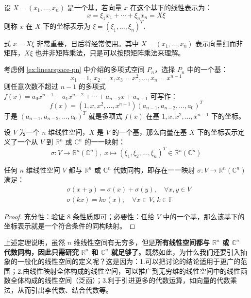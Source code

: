 \begin{definition}[坐标表示]
设 $X=(x_1,\ldots,x_n)$ 是一个基，若向量 $x$ 在这个基下的线性表示为：
\[x=\xi_1 x_1+\cdots+\xi_nx_n=X\xi\]
则称 $x$ 在 $X$ 下的坐标表示为 $\xi=(\xi_1,\ldots,\xi_n)^{T}$.
\end{definition}

\begin{remark}
式 $x=X\xi$ 非常重要，日后将经常使用。其中 $X=(x_1,\ldots,x_n)$ 表示向量组而非矩阵，$X\xi$ 也并非矩阵乘法，只是可以按照矩阵乘法来理解。
\end{remark}

\begin{example}
考虑例 \ref{ex:linearspace-pn} 中介绍的多项式空间 $P_n$，选择 $P_n$ 中的一个基：
\[
    x_1=1,\,x_2=x,x_3=x^2,\ldots,x_n=x^{n-1}
\]
则任意次数不超过 $n-1$ 的多项式 $f(x)=a_0x^{n-1}+a_1x^{n-2}+\cdots+a_{n-2}x+a_{n-1}$ 可写作：
\[
    f(x)=(1,x,x^2,\ldots,x^{n-1})(a_{n-1},a_{n-2},\ldots,a_0)^T
\]
于是 $(a_{n-1},a_{n-2},\ldots,a_0)^T$ 就是多项式 $f(x)$ 在基 $1,x,x^2,\ldots,x^{n-1}$ 下的坐标。
\end{example}

\begin{definition}[坐标表示与映射]
设 $V$ 为一个 $n$ 维线性空间，$X$ 是 $V$ 的一个基，那么向量在基 $X$ 下的坐标表示定义了一个从 $V$ 到 $\mathbb R^n$ 或 $\mathbb C^n$ 的一一映射：
\[
    \sigma: V\to\mathbb R^n (\mathbb C^n),\; x\mapsto (\xi_1,\xi_2,\ldots,\xi_n)^T\in\mathbb R^n (\mathbb C^n)
\]
\end{definition}

\begin{theorem}
任何 $n$ 维线性空间 $V$ 都与 $\mathbb R^n$ 或 $\mathbb C^n$ 代数同构，即存在一一映射 $\sigma:V\to\mathbb R^n(\mathbb C^n)$ 满足：
\begin{align*}
    &\sigma(x+y)=\sigma(x)+\sigma(y),\quad\forall x,y\in V\\
    &\sigma(kx)=k\sigma(x),\quad\forall x\in V,\,k\in \mathbb F
\end{align*}
\end{theorem}

\begin{proof}
充分性：验证 8 条性质即可；必要性：任给 $V$ 中的一个基，那么该基下的坐标表示就是一个符合条件的同构映射。
\end{proof}

上述定理说明，虽然 $n$ 维线性空间有无穷多，但是\textbf{所有线性空间都与 $\mathbb R^n$ 或 $\mathbb C^n$ 代数同构，因此只需研究 $\mathbb R^n$ 和 $\mathbb C^n$ 就足够了}。既然如此，为什么我们还要引入抽象的一般化的线性空间的定义呢？这是因为：1.可以把讨论的结论适用于更广的范围；2.由线性映射全体构成的线性空间，可以推广到无穷维的线性空间中的线性函数全体构成的线性空间（泛函）；3.利于引进更多的代数运算，如向量的代数乘法，从而引出李代数、结合代数等。

